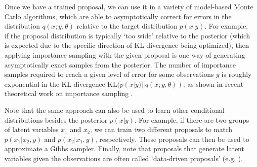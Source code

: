 \documentclass{article}
\begin{document}
Once we have a trained proposal, we can use it in a variety of model-based Monte Carlo algorithms, which are able to asymptotically correct for errors in the distribution $q(x; y, \theta)$ relative to the target distribution $p(x | y)$.
For example, if the proposal distribution is typically `too wide' relative to the posterior (which is expected due to the specific direction of KL divergence being optimized), then applying importance sampling with the given proposal is one way of generating asymptotically exact samples from the posterior.
The number of importance samples required to reach a given level of error for some observations $y$ is roughly exponential in the KL divergence $\mbox{KL}(p(x | y) || q(x; y, \theta))$, as shown in recent theoretical work on importance sampling \cite{chatterjee2018sample}.

Note that the same approach can also be used to learn other conditional distributions besides the posterior $p(x | y)$.
For example, if there are two groups of latent variables $x_1$ and $x_2$, we can train two different proposals to match $p(x_1 | x_2, y)$ and $p(x_2 | x_1, y)$, respectively.
These proposals can then be used to approximate a Gibbs sampler.
Finally, note that proposals that generate latent variables given the observations are often called `data-driven proposals' (e.g. \cite{tu2002image}).
\end{document}
